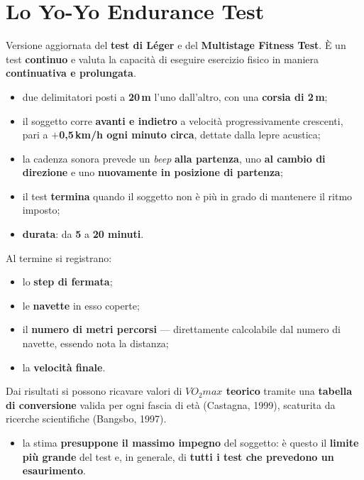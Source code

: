 \section{Lo Yo-Yo Endurance Test}

Versione aggiornata del \textbf{test di Léger} e del \textbf{Multistage Fitness Test}. È un test
\textbf{continuo} e valuta la capacità di eseguire esercizio fisico in maniera \textbf{continuativa
e prolungata}.

\begin{itemize}
  \item due delimitatori posti a \textbf{20\,m} l'uno dall'altro, con una \textbf{corsia di 2\,m};
  \item il soggetto corre \textbf{avanti e indietro} a velocità progressivamente crescenti, pari a
    \textbf{$+$0,5\,km/h ogni minuto circa}, dettate dalla lepre acustica;
  \item la cadenza sonora prevede un \textit{beep} \textbf{alla partenza}, uno \textbf{al cambio di
    direzione} e uno \textbf{nuovamente in posizione di partenza};
  \item il test \textbf{termina} quando il soggetto non è più in grado di mantenere il ritmo
    imposto;
  \item \textbf{durata}: da \textbf{5} a \textbf{20 minuti}.
\end{itemize}

Al termine si registrano:

\begin{itemize}
  \item lo \textbf{step di fermata};
  \item le \textbf{navette} in esso coperte;
  \item il \textbf{numero di metri percorsi} --- direttamente calcolabile dal numero di navette,
    essendo nota la distanza;
  \item la \textbf{velocità finale}.
\end{itemize}

Dai risultati si possono ricavare valori di \textbf{$VO_2max$ teorico} tramite una \textbf{tabella
di conversione} valida per ogni fascia di età (Castagna, 1999), scaturita da ricerche scientifiche
(Bangsbo, 1997).

\begin{itemize}
  \item la stima \textbf{presuppone il massimo impegno} del soggetto: è questo il \textbf{limite
    più grande} del test e, in generale, di \textbf{tutti i test che prevedono un esaurimento}.
\end{itemize}

